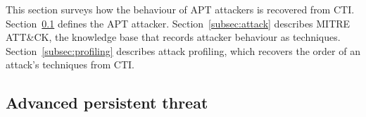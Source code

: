 \documentclass{cshonours}
\begin{document}
This section surveys how the behaviour of APT attackers is recovered from
CTI. Section~\ref{subsec:apt} defines the APT attacker.
Section~\ref{subsec:attack} describes MITRE ATT\&CK, the knowledge base
that records attacker behaviour as techniques.
Section~\ref{subsec:profiling} describes attack profiling, which recovers
the order of an attack's techniques from CTI.

\subsection{Advanced persistent threat}
\label{subsec:apt}
\end{document}
